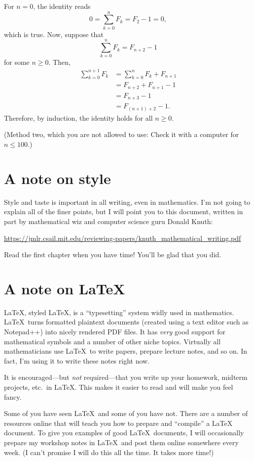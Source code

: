 \documentclass[12pt]{article}
\theoremstyle{definition}
\begin{document}
\begin{Answer}
    For $n = 0$, the identity reads
    \begin{equation*}
        0 = \sum_{k = 0}^n F_k = F_2 - 1 = 0,
    \end{equation*}
    which is true. Now, suppose that
    \begin{equation*}
        \sum_{k = 0}^n F_k = F_{n + 2} - 1
    \end{equation*}
    for some $n \geq 0$. Then,
    \begin{align*}
        \sum_{k = 0}^{n + 1} F_k &= \sum_{k = 0}^n F_k + F_{n + 1} \\
                                 &= F_{n + 2} + F_{n + 1} - 1 \\
                                 &= F_{n + 3} - 1 \\
                                 &= F_{(n + 1) + 2} - 1.
    \end{align*}
    Therefore, by induction, the identity holds for all $n \geq 0$.

    (Method two, which you are not allowed to use: Check it with a computer for
    $n \leq 100$.)
\end{Answer}

\section*{A note on style}%

Style and taste is important in all writing, even in mathematics. I'm not going
to explain all of the finer points, but I will point you to this document,
written in part by mathematical wiz and computer science guru Donald Knuth:

\url{https://jmlr.csail.mit.edu/reviewing-papers/knuth_mathematical_writing.pdf}

Read the first chapter when you have time! You'll be glad that you did.

\section*{A note on \LaTeX}%

LaTeX, styled \LaTeX, is a ``typesetting'' system widly used in mathematics.
\LaTeX\ turns formatted plaintext documents (created using a text editor such
as Notepad++) into nicely rendered PDF files. It has \emph{very} good support
for mathematical symbols and a number of other niche topics. Virtually all
mathematicians use \LaTeX\ to write papers, prepare lecture notes, and so on.
In fact, I'm using it to write these notes right now.

It is encouraged---but \emph{not} required---that you write up your homework,
midterm projects, etc.~in \LaTeX. This makes it easier to read and will make
you feel fancy.

Some of you have seen \LaTeX\ and some of you have not. There are a number of
resources online that will teach you how to prepare and ``compile'' a \LaTeX
document. To give you examples of good \LaTeX\ documents, I will occasionally
prepare my workshop notes in \LaTeX\ and post them online somewhere every week.
(I can't promise I will do this all the time. It takes more time!)
\end{document}
